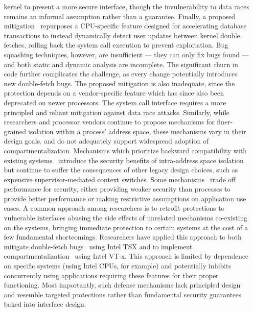 kernel to present a more secure interface, though the invulnerability to 
data races remains an informal assumption rather than a guarantee.
Finally, a proposed mitigation~\cite{schwartzDECAF} repurposes a CPU-specific
feature
designed for accelerating database transactions to instead dynamically
detect user updates between kernel double fetches, rolling back the
system call execution to prevent exploitation.
Bug squashing techniques, however, are insufficient --- they can only fix
bugs found --- and both static and dynamic analysis are incomplete.
The significant churn in code further complicates the challenge, as every
change potentially introduces new double-fetch bugs.
The proposed mitigation is also inadequate, since the protection depends on
a vendor-specific feature which has since also been deprecated on newer
processors.
The system call interface requires a more principled and reliant
mitigation against data race attacks.
Similarly, while researchers and processor vendors continue to propose 
mechanisms for finer-grained isolation within a process' address space, 
these mechanisms vary in their design goals, and do not adequately
support widespread adoption of compartmentalization.
Mechanisms which prioritize backward compatibility with existing 
systems~\cite{LittonVE0BD16, HsuHEP16, HedayatiGJCSSM19Hodor, LeeSK18, DuHXZC19XPC}
introduce the security benefits of intra-address space isolation
but continue to suffer the consequences of other legacy design choices, 
such as expensive supervisor-mediated context switches.
Some mechanisms~\cite{ParkLXMK19, HedayatiGJCSSM19Hodor} trade off 
performance for security, either providing weaker security than processes
to provide better performance or making restrictive assumptions on
application use cases.
A common approach among researchers is to retrofit protections to vulnerable
interfaces abusing the side effects of unrelated mechanisms co-existing on
the systems, bringing immediate protection to certain systems at the cost
of a few fundamental shortcomings.
Researchers have applied this approach to both mitigate double-fetch
bugs~\cite{schwartzDECAF} using Intel TSX and to implement 
compartmentalization~\cite{HedayatiGJCSSM19Hodor,LeeSK18} using Intel VT-x.
This approach is limited by dependence on specific 
systems (using Intel CPUs, for example) and potentially
inhibits concurrently using applications requiring these features for their 
proper functioning.
Most importantly, such defense mechanisms lack principled design and 
resemble targeted protections rather than 
fundamental security guarantees baked into interface design.

